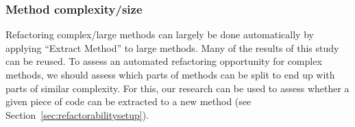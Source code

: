 \subsubsection{Method complexity/size}


Refactoring complex/large methods can largely be done automatically by applying ``Extract Method'' to large methods. Many of the results of this study can be reused. To assess an automated refactoring opportunity for complex methods, we should assess which parts of methods can be split to end up with parts of similar complexity. For this, our research can be used to assess whether a given piece of code can be extracted to a new method (see Section~\ref{sec:refactorabilitysetup}).



